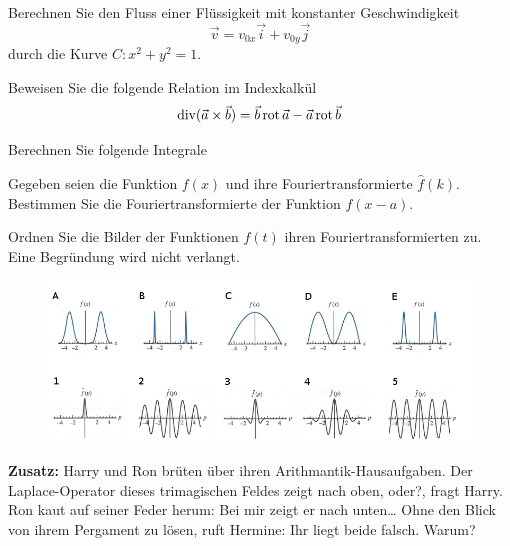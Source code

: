 \documentclass{atistandalonetask}
\begin{document}
\begin{atiTask}[
	title = Weitere Fragen
]
	\providecommand{\D}{\mathrm{d}}

\begin{atiSubtasks}
	\item Berechnen Sie den Fluss einer Flüssigkeit mit konstanter Geschwindigkeit 
	\[
	\vec{v}=v_{0x}\vec{i}+v_{0y}\vec{j}
	\]
	durch die Kurve $C: x^2+y^2=1$. %
	\item Beweisen Sie die folgende Relation im Indexkalkül
	\[\operatorname{div}(\vec{a}\times\vec{b})=\vec{b}\operatorname{rot} \vec{a}-\vec{a}\operatorname{rot}\vec{b}
	\]
	\item Berechnen Sie folgende Integrale
	\begin{multicols}{2}
	\begin{atiSubequations}
		\item{}
		\item{}
	    \item{}
	    \item{}
	\end{atiSubequations}
	\end{multicols}
	\item Gegeben seien die Funktion $f(x)$ und ihre Fouriertransformierte $\hat{f}(k)$. Bestimmen Sie die Fouriertransformierte der Funktion $f(x-a)$.
	\item Ordnen Sie die Bilder der Funktionen $f(t)$ ihren Fouriertransformierten zu. Eine Begründung wird nicht verlangt.
	\begin{figure}[H]
	\centering
	\includegraphics[width=1\linewidth]{./picture-klausurss18b}
	\end{figure}
	\item \textbf{Zusatz:} Harry und Ron brüten über ihren Arithmantik-Hausaufgaben. \glqq Der Laplace-Operator dieses trimagischen 
	Feldes zeigt nach oben, oder?\grqq{}, fragt Harry. Ron kaut auf seiner Feder herum: \glqq Bei mir zeigt er nach unten\dots\grqq{} Ohne den Blick von ihrem Pergament zu lösen, ruft Hermine: \glqq Ihr liegt beide falsch.\grqq{} Warum?
\end{atiSubtasks}

\end{atiTask}
\end{document}
